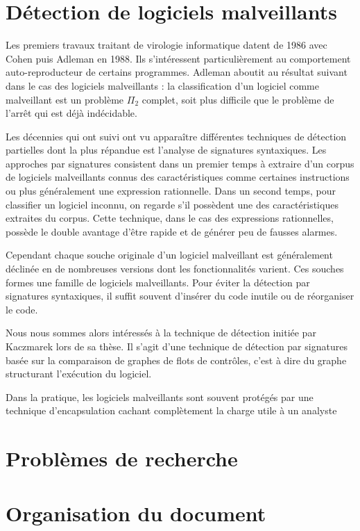 \section{Détection de logiciels malveillants}
Les premiers travaux traitant de virologie informatique datent de 1986 avec Cohen \cite{Cohen86} puis Adleman \cite{Adleman88} en 1988. Ils s'intéressent particulièrement au comportement auto-reproducteur de certains programmes. Adleman  aboutit au résultat suivant dans le cas des logiciels malveillants : la classification d'un logiciel comme malveillant est un problème $\Pi_2$ complet, soit plus difficile que le problème de l'arrêt qui est déjà indécidable.

Les décennies qui ont suivi ont vu apparaître différentes techniques de détection partielles dont la plus répandue est l'analyse de signatures syntaxiques. Les approches par signatures consistent dans un premier temps à extraire d'un corpus de logiciels malveillants connus des caractéristiques comme certaines instructions ou plus généralement une expression rationnelle. Dans un second temps, pour classifier un logiciel inconnu, on regarde s'il possèdent une des caractéristiques extraites du corpus.
Cette technique, dans le cas des expressions rationnelles, possède le double avantage d'être rapide et de générer peu de fausses alarmes.

Cependant chaque souche originale d'un logiciel malveillant est généralement déclinée en de nombreuses versions dont les fonctionnalités varient. Ces souches formes une famille de logiciels malveillants. Pour éviter la détection par signatures syntaxiques, il suffit souvent d'insérer du code inutile ou de réorganiser le code.

Nous nous sommes alors intéressés à la technique de détection initiée par Kaczmarek \cite{AThierry_BKM08} lors de sa thèse. Il s'agit d'une technique de détection par signatures basée sur la comparaison de graphes de flots de contrôles, c'est à dire du graphe structurant l'exécution du logiciel.

Dans la pratique, les logiciels malveillants sont souvent protégés par une technique d'encapsulation cachant complètement la charge utile à un analyste 

\section{Problèmes de recherche}


\section{Organisation du document}